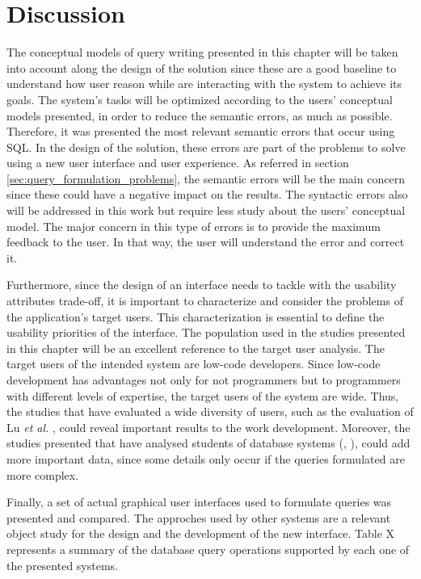 \section{Discussion}
\label{sec:discussion}
The conceptual models of query writing presented in this chapter will be taken into account along the design of the solution since these are a good baseline to understand how user reason while are interacting with the system to achieve its goals. The system's tasks will be optimized according to the users' conceptual models presented, in order to reduce the semantic errors, as much as possible. Therefore, it was presented the most relevant semantic errors that occur using SQL. In the design of the solution, these errors are part of the problems to solve using a new user interface and user experience. As referred in section \ref{sec:query_formulation_problems}, the semantic errors will be the main concern since these could have a negative impact on the results. The syntactic errors also will be addressed in this work but require less study about the users’ conceptual model. The major concern in this type of errors is to provide the maximum feedback to the user. In that way, the user will understand the error and correct it.

Furthermore, since the design of an interface needs to tackle with the usability attributes trade-off, it is important to characterize and consider the problems of the application's target users. This characterization is essential to define the usability priorities of the interface. The population used in the studies presented in this chapter will be an excellent reference to the target user analysis. The target users of the intended system are low-code developers. Since low-code development has advantages not only for not programmers but to programmers with different levels of expertise, the target users of the system are wide. Thus, the studies that have evaluated a wide diversity of users, such as the evaluation of Lu \textit{et al.} \cite{aSurveyOnUsageOfSQL}, could reveal important results to the work development. Moreover, the studies presented that have analysed students of database systems (\cite{studentsSemanticMistakesInWritingSevenDifferentTypesOfSQLQueries}, \cite{errorsAndComplicationsInSQLQueryFormulation}), could add more important data, since some details only occur if the queries formulated are more complex.

Finally, a set of actual graphical user interfaces used to formulate queries was presented and compared. The approches used by other systems are a relevant object study for the design and the development of the new interface. Table X represents a summary of the database query operations supported by each one of the presented systems.

